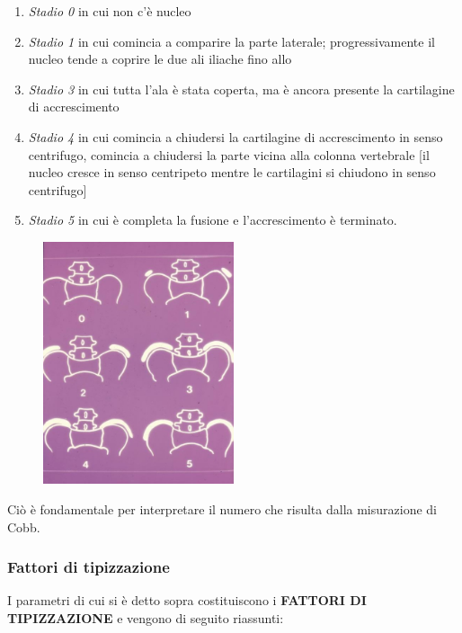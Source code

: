 \begin{enumerate}
\def\labelenumi{\arabic{enumi}.}
\item
  \emph{Stadio 0} in cui non c'è nucleo
\item 
  \emph{Stadio 1} in cui comincia a comparire la parte laterale;
  progressivamente il nucleo tende a coprire le due ali iliache fino
  allo
\item 
  \emph{Stadio 3} in cui tutta l'ala è stata coperta, ma è ancora
  presente la cartilagine di accrescimento
\item 
  \emph{Stadio 4} in cui comincia a chiudersi la cartilagine di
  accrescimento in senso centrifugo, comincia a chiudersi la parte
  vicina alla colonna vertebrale {[}il nucleo cresce in senso centripeto
  mentre le cartilagini si chiudono in senso centrifugo{]}
\item 
  \emph{Stadio 5} in cui è completa la fusione e l'accrescimento è
  terminato.
\end{enumerate}
\begin{figure}[!ht]
\centering
	\includegraphics[width=0.5\textwidth]{012/image30.jpeg}
\end{figure}

Ciò è fondamentale per interpretare il numero che risulta dalla
misurazione di Cobb.

\subsubsection{Fattori di tipizzazione}


I parametri di cui si è detto sopra costituiscono i \textbf{FATTORI DI
TIPIZZAZIONE} e vengono di seguito riassunti:


